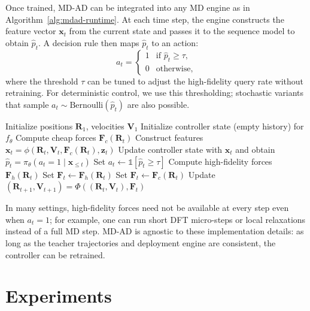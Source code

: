 \documentclass{article}
\begin{document}
Once trained, MD-AD can be integrated into any MD engine as in Algorithm~\ref{alg:mdad-runtime}. At each time step, the engine constructs the feature vector $\mathbf{x}_t$ from the current state and passes it to the sequence model to obtain $\hat{p}_t$. A decision rule then maps $\hat{p}_t$ to an action:
\begin{equation}
    a_t = 
    \begin{cases}
        1 & \text{if } \hat{p}_t \geq \tau, \\
        0 & \text{otherwise},
    \end{cases}
\end{equation}
where the threshold $\tau$ can be tuned to adjust the high-fidelity query rate without retraining. For deterministic control, we use this thresholding; stochastic variants that sample $a_t \sim \text{Bernoulli}(\hat{p}_t)$ are also possible.

\begin{algorithm}[t]
\caption{MD-AD runtime integration (single trajectory)}
\label{alg:mdad-runtime}
\begin{algorithmic}[1]
\STATE Initialize positions $\mathbf{R}_1$, velocities $\mathbf{V}_1$
\STATE Initialize controller state (empty history) for $f_\theta$
    \STATE Compute cheap forces $\mathbf{F}_c(\mathbf{R}_t)$
    \STATE Construct features $\mathbf{x}_t = \phi(\mathbf{R}_t, \mathbf{V}_t, \mathbf{F}_c(\mathbf{R}_t), \mathbf{z}_t)$
    \STATE Update controller state with $\mathbf{x}_t$ and obtain $\hat{p}_t = \pi_\theta(a_t=1 \mid \mathbf{x}_{\le t})$
    \STATE Set $a_t \leftarrow \mathbb{1}[\hat{p}_t \geq \tau]$
        \STATE Compute high-fidelity forces $\mathbf{F}_h(\mathbf{R}_t)$
        \STATE Set $\mathbf{F}_t \leftarrow \mathbf{F}_h(\mathbf{R}_t)$
    \ELSE
        \STATE Set $\mathbf{F}_t \leftarrow \mathbf{F}_c(\mathbf{R}_t)$
    \ENDIF
    \STATE Update $(\mathbf{R}_{t+1}, \mathbf{V}_{t+1}) = \Phi((\mathbf{R}_t,\mathbf{V}_t), \mathbf{F}_t)$
\ENDFOR
\end{algorithmic}
\end{algorithm}

In many settings, high-fidelity forces need not be available at every step even when $a_t=1$; for example, one can run short DFT micro-steps or local relaxations instead of a full MD step. MD-AD is agnostic to these implementation details: as long as the teacher trajectories and deployment engine are consistent, the controller can be retrained.

\section{Experiments}
\label{sec:experiments}
\end{document}
